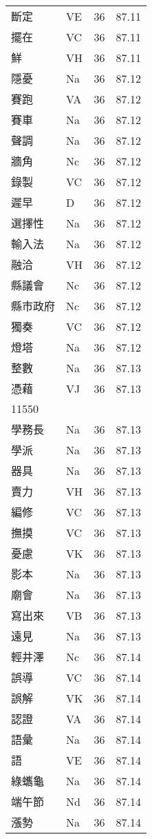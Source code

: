 \documentclass[twocolumn]{book}
\begin{document}
\begin{supertabular}{llrr}
斷定 & VE & 36 &  87.11\\
擺在 & VC & 36 &  87.11\\
鮮 & VH & 36 &  87.11\\
隱憂 & Na & 36 &  87.12\\
賽跑 & VA & 36 &  87.12\\
賽車 & Na & 36 &  87.12\\
聲調 & Na & 36 &  87.12\\
牆角 & Nc & 36 &  87.12\\
錄製 & VC & 36 &  87.12\\
遲早 & D & 36 &  87.12\\
選擇性 & Na & 36 &  87.12\\
輸入法 & Na & 36 &  87.12\\
融洽 & VH & 36 &  87.12\\
縣議會 & Nc & 36 &  87.12\\
縣市政府 & Nc & 36 &  87.12\\
獨奏 & VC & 36 &  87.12\\
燈塔 & Na & 36 &  87.12\\
整數 & Na & 36 &  87.13\\
憑藉 & VJ & 36 &  87.13\\
11550\\
學務長 & Na & 36 &  87.13\\
學派 & Na & 36 &  87.13\\
器具 & Na & 36 &  87.13\\
賣力 & VH & 36 &  87.13\\
編修 & VC & 36 &  87.13\\
撫摸 & VC & 36 &  87.13\\
憂慮 & VK & 36 &  87.13\\
影本 & Na & 36 &  87.13\\
廟會 & Na & 36 &  87.13\\
寫出來 & VB & 36 &  87.13\\
遠見 & Na & 36 &  87.13\\
輕井澤 & Nc & 36 &  87.14\\
誤導 & VC & 36 &  87.14\\
誤解 & VK & 36 &  87.14\\
認證 & VA & 36 &  87.14\\
語彙 & Na & 36 &  87.14\\
語 & VE & 36 &  87.14\\
綠蠵龜 & Na & 36 &  87.14\\
端午節 & Nd & 36 &  87.14\\
漲勢 & Na & 36 &  87.14\\

\end{supertabular}
\end{document}
